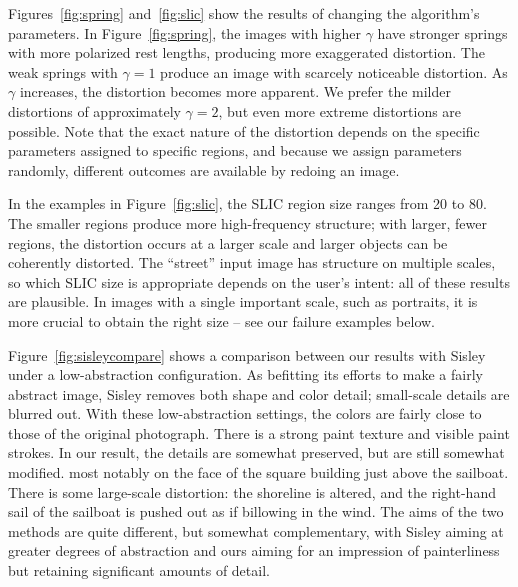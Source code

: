 Figures~\ref{fig:spring} and~\ref{fig:slic} show the results of changing the algorithm's parameters.
In Figure~\ref{fig:spring}, the images with higher $\gamma$ have stronger springs with more polarized rest lengths, producing more exaggerated distortion. The weak springs with $\gamma=1$ produce an image with scarcely noticeable distortion. As $\gamma$ increases, the distortion becomes more apparent. We prefer the milder distortions of approximately $\gamma=2$, but even more extreme distortions are possible. Note that the exact nature of the distortion depends on the specific parameters assigned to specific regions, and because we assign parameters randomly, different outcomes are available by redoing an image.

In the examples in Figure~\ref{fig:slic}, the SLIC region size ranges from 20 to 80. The smaller regions
produce more high-frequency structure; with larger, fewer regions, the distortion occurs at a larger scale
and larger objects can be coherently distorted. The ``street'' input image has structure on multiple scales,
so which SLIC size is appropriate depends on the user's intent: all of these results are plausible. In images
with a single important scale, such as portraits, it is more crucial to obtain the right size -- see our failure examples below.

Figure~\ref{fig:sisleycompare} shows a comparison between our results with Sisley~\cite{sisley}
under a low-abstraction configuration. As befitting its efforts to make a fairly abstract image, Sisley
removes both shape and color detail; small-scale details are blurred out. With these low-abstraction
settings, the colors are fairly close to those of the original photograph. There is a strong paint texture
and visible paint strokes. In our result, the details are somewhat preserved, but are still somewhat
modified. most notably on the face of the square building just above the sailboat. There is some large-scale distortion: the shoreline is altered, and the right-hand sail of the sailboat is pushed out as if billowing in the wind.
The aims of the
two methods are quite different, but somewhat complementary, with Sisley aiming at greater degrees
of abstraction and ours aiming for an impression of painterliness but retaining significant amounts
of detail.

